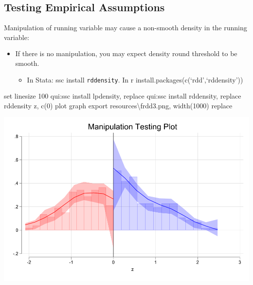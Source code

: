 \documentclass[
  letterpaper,
  DIV=11,
  numbers=noendperiod]{scrartcl}
\newenvironment{Shaded}{\begin{snugshade}}{\end{snugshade}}
\newcommand{\DecValTok}[1]{\textcolor[rgb]{0.68,0.00,0.00}{#1}}
\newcommand{\KeywordTok}[1]{\textcolor[rgb]{0.00,0.23,0.31}{#1}}
\newcommand{\NormalTok}[1]{\textcolor[rgb]{0.00,0.23,0.31}{#1}}
\providecommand{\tightlist}{%
  \setlength{\itemsep}{0pt}\setlength{\parskip}{0pt}}\usepackage{longtable,booktabs,array}
\begin{document}
\subsection{Testing Empirical
Assumptions}\label{testing-empirical-assumptions}

Manipulation of running variable may cause a non-smooth density in the
running variable:

\begin{itemize}
\tightlist
\item
  If there is no manipulation, you may expect density round threshold to
  be smooth.

  \begin{itemize}
  \tightlist
  \item
    In Stata: ssc install \texttt{rddensity}. In r
    install.packages(c(`rdd',`rddensity'))
  \end{itemize}
\end{itemize}

\begin{Shaded}
\begin{Highlighting}[]
\KeywordTok{set} \DecValTok{linesize}\NormalTok{ 100}
\KeywordTok{qui}\NormalTok{:}\KeywordTok{ssc}\NormalTok{ install  lpdensity, }\KeywordTok{replace}
\KeywordTok{qui}\NormalTok{:}\KeywordTok{ssc}\NormalTok{ install  rddensity, }\KeywordTok{replace}
\NormalTok{rddensity z, c(0) plot}
\KeywordTok{graph} \KeywordTok{export}\NormalTok{ resources\textbackslash{}frdd3.png, }\KeywordTok{width}\NormalTok{(1000) }\KeywordTok{replace}
\end{Highlighting}
\end{Shaded}

\includegraphics{resources/frdd3.png}
\end{document}
